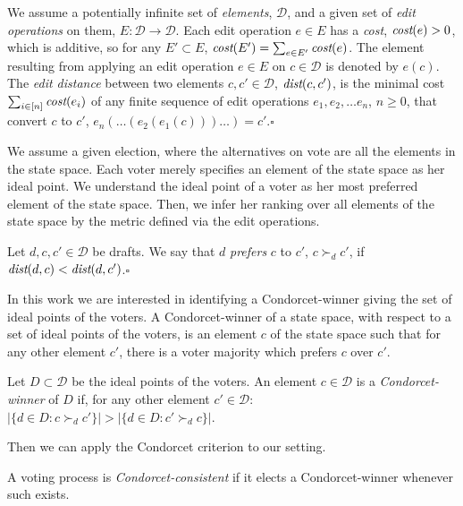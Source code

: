 \documentclass[sigconf]{aamas}  %
\newcommand{\qqed}{\hfill$\square$}
\newcommand{\calD}{\mathcal{D}}
\newcommand{\prefers}[1]{\succ_{#1}}
\newcommand{\dist}{\emph{dist}}
\newcommand{\cost}{\emph{cost}}
\begin{document}
\begin{definition}
%
We assume a potentially infinite set of \emph{elements}, $\calD$, and a given set of \emph{edit operations} on them, $E: \calD \rightarrow \calD$. Each edit operation $e \in E$ has a \emph{cost}, $\cost(e) > 0$,  which is additive, so for any $E' \subset E$, $\cost(E') = \sum_{e \in E'} \cost(e)$. The element resulting from applying an edit operation $e \in E$ on $c \in \calD$ is denoted by $e(c)$.  The \emph{edit distance} between two elements $c, c' \in \calD$, $\dist(c, c')$, is the minimal cost $\sum_{i \in [n]} \cost(e_i)$ of any finite sequence of edit operations $e_1, e_2, \ldots e_n$, $n \ge 0$, that convert $c$  to $c'$, $e_n(\ldots(e_2(e_1(c)))\ldots) = c'$.\qqed  
%
\end{definition}

We assume a given election, where the alternatives on vote are all the elements in the state space. Each voter merely specifies an element of the state space as her ideal point. We understand the ideal point of a voter as her most preferred element of the state space. Then, we infer her ranking over all elements of the state space by the metric defined via the edit operations.

\begin{definition}[Prefers]\label{lemma:prefers}
%
Let $d, c, c' \in \calD$ be drafts.  We say that  $d$ \emph{prefers}  $c$ to $c'$, $ c \prefers{d} c'$, if $\dist(d, c) < \dist(d, c')$.\qqed
\end{definition}

In this work we are interested in identifying a Condorcet-winner giving the set of ideal points of the voters.
%
A Condorcet-winner of a state space, with respect to a set of ideal points of the voters, is an element $c$ of the state space such that for any other element $c'$, there is a voter majority which prefers $c$ over $c'$.

\begin{definition}\label{lemma:condorcet-winner}
%
Let $D \subset \calD$ be the ideal points of the voters. An element $c \in \calD$ is a \emph{Condorcet-winner} of $D$ if, for any other element $c' \in \calD$:  $|\{ d \in D : c \prefers{d} c' \}| > |\{ d \in D : c' \prefers{d} c \}|$.
%
\end{definition}

Then we can apply the Condorcet criterion to our setting.

\begin{definition}
%
A voting process is \emph{Condorcet-consistent} if it elects a Condorcet-winner whenever such exists.
%
\end{definition}
\end{document}
